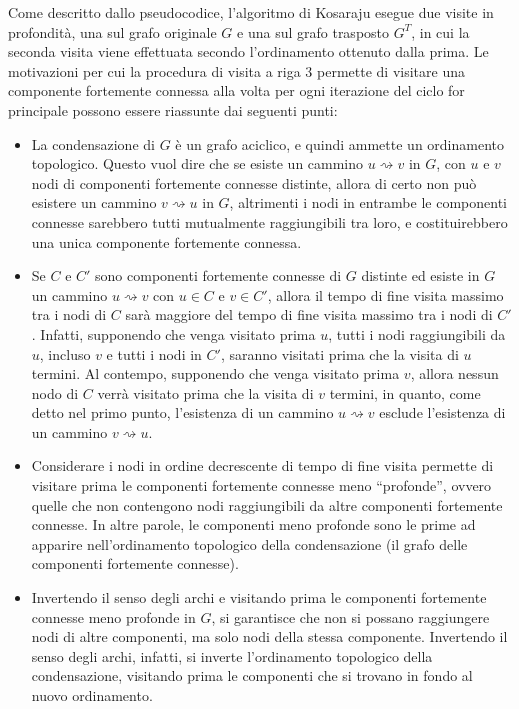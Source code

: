 Come descritto dallo pseudocodice, l'algoritmo di Kosaraju esegue due visite in profondit\`a, una sul grafo
originale $G$ e una sul grafo trasposto $G^T$, in cui la seconda visita viene effettuata secondo l'ordinamento
ottenuto dalla prima.
Le motivazioni per cui la procedura di visita a riga $3$ permette di visitare una componente fortemente
connessa alla volta per ogni iterazione del ciclo for principale possono essere riassunte dai seguenti punti:
\begin{itemize}
    \item La condensazione di $G$ \`e un grafo aciclico, e quindi ammette un ordinamento topologico.
        Questo vuol dire che se esiste un cammino $u \rightsquigarrow v$ in $G$, con $u$ e $v$ nodi di componenti
        fortemente connesse distinte, allora di certo non pu\`o esistere un cammino $v \rightsquigarrow u$ in $G$,
        altrimenti i nodi in entrambe le componenti connesse sarebbero tutti mutualmente raggiungibili tra loro, e
        costituirebbero una unica componente fortemente connessa.
    \item Se $C$ e $C'$ sono componenti fortemente connesse di $G$ distinte ed esiste in $G$ un cammino
        $u \rightsquigarrow v$ con $u \in C$ e $v \in C'$, allora il tempo di fine visita massimo tra i nodi di $C$
        sar\`a maggiore del tempo di fine visita massimo tra i nodi di $C'$.
        Infatti, supponendo che venga visitato prima $u$, tutti i nodi raggiungibili da $u$, incluso $v$ e tutti i nodi
        in $C'$, saranno visitati prima che la visita di $u$ termini.
        Al contempo, supponendo che venga visitato prima $v$, allora nessun nodo di $C$ verr\`a visitato prima che
        la visita di $v$ termini, in quanto, come detto nel primo punto, l'esistenza di un cammino
        $u \rightsquigarrow v$ esclude l'esistenza di un cammino $v \rightsquigarrow u$.
    \item Considerare i nodi in ordine decrescente di tempo di fine visita permette di visitare prima le componenti
        fortemente connesse meno ``profonde'', ovvero quelle che non contengono nodi raggiungibili da altre
        componenti fortemente connesse.
        In altre parole, le componenti meno profonde sono le prime ad apparire nell'ordinamento topologico della
        condensazione (il grafo delle componenti fortemente connesse).
    \item Invertendo il senso degli archi e visitando prima le componenti fortemente connesse meno profonde in $G$, si
        garantisce che non si possano raggiungere nodi di altre componenti, ma solo nodi della stessa componente.
        Invertendo il senso degli archi, infatti, si inverte l'ordinamento topologico della condensazione, visitando
        prima le componenti che si trovano in fondo al nuovo ordinamento.
\end{itemize}

